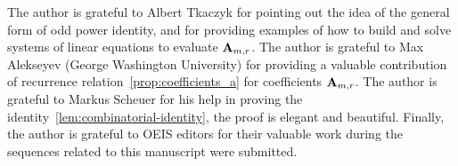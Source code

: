 The author is grateful to Albert Tkaczyk for pointing out the idea of the general form of odd power identity,
and for providing examples of how to build and solve systems of linear equations to evaluate ${\mathbf{A}} \sb{m,r}$.
The author is grateful to Max Alekseyev (George Washington University) for providing a valuable contribution
of recurrence relation~\eqref{prop:coefficients_a} for coefficients ${\mathbf{A}} \sb{m,r}$.
The author is grateful to Markus Scheuer for his help in proving the identity~\eqref{lem:combinatorial-identity},
the proof is elegant and beautiful.
Finally, the author is grateful to OEIS editors for their valuable work during the sequences
related to this manuscript were submitted.
